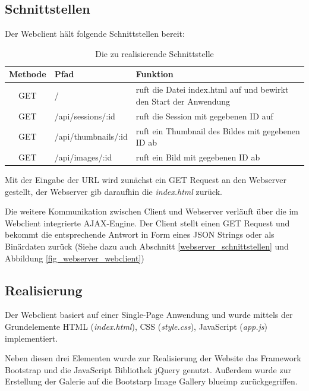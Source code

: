 \subsection{Schnittstellen}
Der Webclient hält folgende Schnittstellen bereit:

\begin{table}[h]
	\begin{center}
		\begin{tabularx}{\textwidth}{|c|l|X|}
			\hline
			\textbf{Methode} & \textbf{Pfad} & \textbf{Funktion}\\
			\hline
			GET & / & ruft die Datei index.html auf und bewirkt den Start der Anwendung \\
			\hline
			GET & /api/sessions/:id & ruft die Session mit gegebenen ID auf \\
			\hline
			GET & /api/thumbnails/:id & ruft ein Thumbnail des Bildes mit gegebenen ID ab \\
			\hline
			GET & /api/images/:id & ruft ein Bild mit gegebenen ID ab \\
			\hline
		\end{tabularx}
		\caption{Die zu realisierende Schnittstelle}
		\label{tab_api_routes}
	\end{center}
\end{table}

Mit der Eingabe der URL wird zunächst ein GET Request an den Webserver gestellt, der Webserver gib daraufhin die \textit{index.html} zurück.

Die weitere Kommunikation zwischen Client und Webserver verläuft über die im Webclient integrierte AJAX-Engine. Der Client stellt einen GET Request und bekommt die entsprechende Antwort in Form eines JSON Strings oder als Binärdaten zurück (Siehe dazu auch Abschnitt \ref{webserver_schnittstellen} und Abbildung \ref{fig_webserver_webclient})

\subsection{Realisierung}
Der Webclient basiert auf einer Single-Page Anwendung und wurde mittels der Grundelemente HTML (\textit{index.html}), CSS (\textit{style.css}), JavaScript (\textit{app.js}) implementiert. 

Neben diesen drei Elementen wurde zur Realisierung der Website das Framework Bootstrap und die JavaScript Bibliothek jQuery genutzt. Außerdem wurde zur Erstellung der Galerie auf die Bootstarp Image Gallery blueimp  zurückgegriffen.

